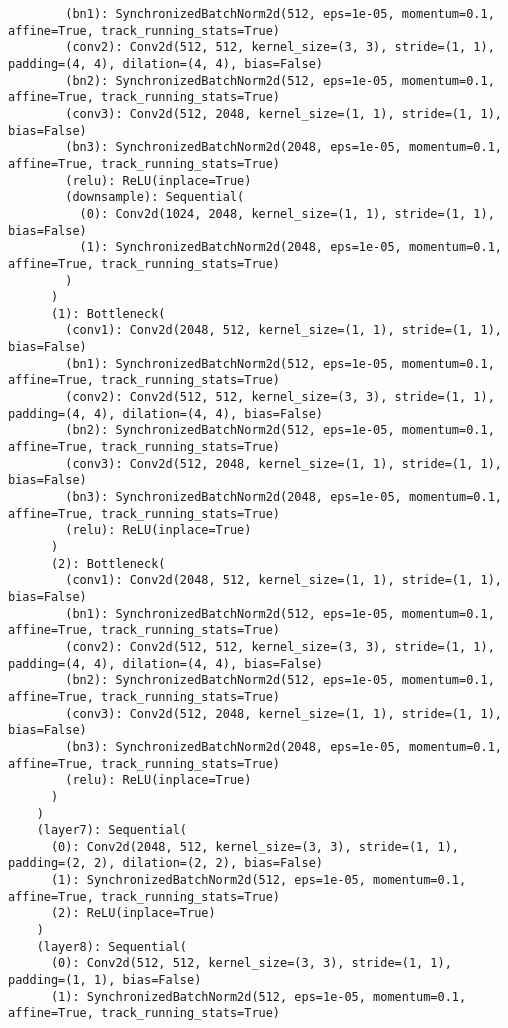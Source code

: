 \begin{verbatim}
        (bn1): SynchronizedBatchNorm2d(512, eps=1e-05, momentum=0.1, affine=True, track_running_stats=True)
        (conv2): Conv2d(512, 512, kernel_size=(3, 3), stride=(1, 1), padding=(4, 4), dilation=(4, 4), bias=False)
        (bn2): SynchronizedBatchNorm2d(512, eps=1e-05, momentum=0.1, affine=True, track_running_stats=True)
        (conv3): Conv2d(512, 2048, kernel_size=(1, 1), stride=(1, 1), bias=False)
        (bn3): SynchronizedBatchNorm2d(2048, eps=1e-05, momentum=0.1, affine=True, track_running_stats=True)
        (relu): ReLU(inplace=True)
        (downsample): Sequential(
          (0): Conv2d(1024, 2048, kernel_size=(1, 1), stride=(1, 1), bias=False)
          (1): SynchronizedBatchNorm2d(2048, eps=1e-05, momentum=0.1, affine=True, track_running_stats=True)
        )
      )
      (1): Bottleneck(
        (conv1): Conv2d(2048, 512, kernel_size=(1, 1), stride=(1, 1), bias=False)
        (bn1): SynchronizedBatchNorm2d(512, eps=1e-05, momentum=0.1, affine=True, track_running_stats=True)
        (conv2): Conv2d(512, 512, kernel_size=(3, 3), stride=(1, 1), padding=(4, 4), dilation=(4, 4), bias=False)
        (bn2): SynchronizedBatchNorm2d(512, eps=1e-05, momentum=0.1, affine=True, track_running_stats=True)
        (conv3): Conv2d(512, 2048, kernel_size=(1, 1), stride=(1, 1), bias=False)
        (bn3): SynchronizedBatchNorm2d(2048, eps=1e-05, momentum=0.1, affine=True, track_running_stats=True)
        (relu): ReLU(inplace=True)
      )
      (2): Bottleneck(
        (conv1): Conv2d(2048, 512, kernel_size=(1, 1), stride=(1, 1), bias=False)
        (bn1): SynchronizedBatchNorm2d(512, eps=1e-05, momentum=0.1, affine=True, track_running_stats=True)
        (conv2): Conv2d(512, 512, kernel_size=(3, 3), stride=(1, 1), padding=(4, 4), dilation=(4, 4), bias=False)
        (bn2): SynchronizedBatchNorm2d(512, eps=1e-05, momentum=0.1, affine=True, track_running_stats=True)
        (conv3): Conv2d(512, 2048, kernel_size=(1, 1), stride=(1, 1), bias=False)
        (bn3): SynchronizedBatchNorm2d(2048, eps=1e-05, momentum=0.1, affine=True, track_running_stats=True)
        (relu): ReLU(inplace=True)
      )
    )
    (layer7): Sequential(
      (0): Conv2d(2048, 512, kernel_size=(3, 3), stride=(1, 1), padding=(2, 2), dilation=(2, 2), bias=False)
      (1): SynchronizedBatchNorm2d(512, eps=1e-05, momentum=0.1, affine=True, track_running_stats=True)
      (2): ReLU(inplace=True)
    )
    (layer8): Sequential(
      (0): Conv2d(512, 512, kernel_size=(3, 3), stride=(1, 1), padding=(1, 1), bias=False)
      (1): SynchronizedBatchNorm2d(512, eps=1e-05, momentum=0.1, affine=True, track_running_stats=True)

\end{verbatim}
